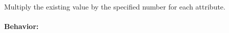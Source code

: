 Multiply the existing value by the specified number for each attribute.

\paragraph{Behavior:}
\begin{itemize}[noitemsep]

\end{itemize}
